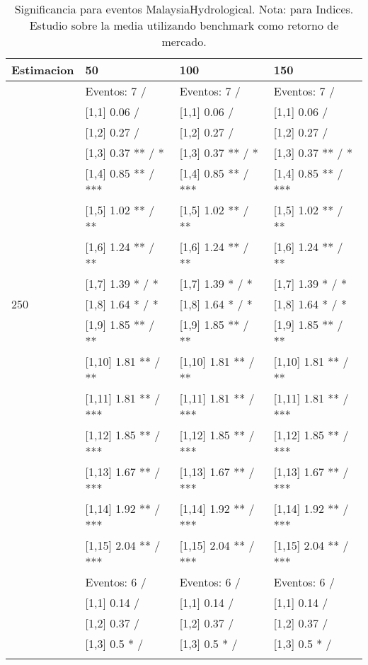 \begin{table}

\caption{Significancia para eventos MalaysiaHydrological. Nota: para Indices. Estudio sobre la media utilizando benchmark como retorno de mercado.}
\centering
\begin{tabular}[t]{llll}
\toprule
Estimacion & 50 & 100 & 150\\
\midrule
 & Eventos:  7 / & Eventos:  7 / & Eventos:  7 /\\
 & {}[1,1] 0.06  / & {}[1,1] 0.06  / & {}[1,1] 0.06  /\\
 & {}[1,2] 0.27  / & {}[1,2] 0.27  / & {}[1,2] 0.27  /\\
 & {}[1,3] 0.37 ** / * & {}[1,3] 0.37 ** / * & {}[1,3] 0.37 ** / *\\
 & {}[1,4] 0.85 ** / *** & {}[1,4] 0.85 ** / *** & {}[1,4] 0.85 ** / ***\\
\addlinespace
 & {}[1,5] 1.02 ** / ** & {}[1,5] 1.02 ** / ** & {}[1,5] 1.02 ** / **\\
 & {}[1,6] 1.24 ** / ** & {}[1,6] 1.24 ** / ** & {}[1,6] 1.24 ** / **\\
 & {}[1,7] 1.39 * / * & {}[1,7] 1.39 * / * & {}[1,7] 1.39 * / *\\
250 & {}[1,8] 1.64 * / * & {}[1,8] 1.64 * / * & {}[1,8] 1.64 * / *\\
 & {}[1,9] 1.85 ** / ** & {}[1,9] 1.85 ** / ** & {}[1,9] 1.85 ** / **\\
\addlinespace
 & {}[1,10] 1.81 ** / ** & {}[1,10] 1.81 ** / ** & {}[1,10] 1.81 ** / **\\
 & {}[1,11] 1.81 ** / *** & {}[1,11] 1.81 ** / *** & {}[1,11] 1.81 ** / ***\\
 & {}[1,12] 1.85 ** / *** & {}[1,12] 1.85 ** / *** & {}[1,12] 1.85 ** / ***\\
 & {}[1,13] 1.67 ** / *** & {}[1,13] 1.67 ** / *** & {}[1,13] 1.67 ** / ***\\
 & {}[1,14] 1.92 ** / *** & {}[1,14] 1.92 ** / *** & {}[1,14] 1.92 ** / ***\\
\addlinespace
 & {}[1,15] 2.04 ** / *** & {}[1,15] 2.04 ** / *** & {}[1,15] 2.04 ** / ***\\
 & Eventos:  6 / & Eventos:  6 / & Eventos:  6 /\\
 & {}[1,1] 0.14  / & {}[1,1] 0.14  / & {}[1,1] 0.14  /\\
 & {}[1,2] 0.37  / & {}[1,2] 0.37  / & {}[1,2] 0.37  /\\
 & {}[1,3] 0.5 * / & {}[1,3] 0.5 * / & {}[1,3] 0.5 * /\\
\addlinespace

\end{tabular}
\end{table}
